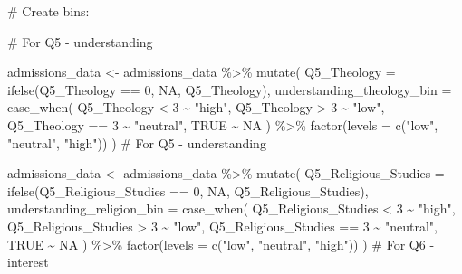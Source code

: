 \documentclass[
  letterpaper,
  DIV=11,
  numbers=noendperiod]{scrartcl}
\newenvironment{Shaded}{\begin{snugshade}}{\end{snugshade}}
\newcommand{\AttributeTok}[1]{\textcolor[rgb]{0.40,0.45,0.13}{#1}}
\newcommand{\CommentTok}[1]{\textcolor[rgb]{0.37,0.37,0.37}{#1}}
\newcommand{\ConstantTok}[1]{\textcolor[rgb]{0.56,0.35,0.01}{#1}}
\newcommand{\DecValTok}[1]{\textcolor[rgb]{0.68,0.00,0.00}{#1}}
\newcommand{\FunctionTok}[1]{\textcolor[rgb]{0.28,0.35,0.67}{#1}}
\newcommand{\NormalTok}[1]{\textcolor[rgb]{0.00,0.23,0.31}{#1}}
\newcommand{\OtherTok}[1]{\textcolor[rgb]{0.00,0.23,0.31}{#1}}
\newcommand{\SpecialCharTok}[1]{\textcolor[rgb]{0.37,0.37,0.37}{#1}}
\newcommand{\StringTok}[1]{\textcolor[rgb]{0.13,0.47,0.30}{#1}}
\begin{document}
\begin{Shaded}
\begin{Highlighting}[]
\CommentTok{\# Create bins:}

\CommentTok{\# For Q5 {-} understanding}

\NormalTok{admissions\_data }\OtherTok{\textless{}{-}}\NormalTok{ admissions\_data }\SpecialCharTok{\%\textgreater{}\%}
  \FunctionTok{mutate}\NormalTok{(}
    \AttributeTok{Q5\_Theology =} \FunctionTok{ifelse}\NormalTok{(Q5\_Theology }\SpecialCharTok{==} \DecValTok{0}\NormalTok{, }\ConstantTok{NA}\NormalTok{, Q5\_Theology),}
    \AttributeTok{understanding\_theology\_bin =} \FunctionTok{case\_when}\NormalTok{(}
\NormalTok{      Q5\_Theology }\SpecialCharTok{\textless{}} \DecValTok{3} \SpecialCharTok{\textasciitilde{}} \StringTok{"high"}\NormalTok{,}
\NormalTok{      Q5\_Theology }\SpecialCharTok{\textgreater{}} \DecValTok{3} \SpecialCharTok{\textasciitilde{}} \StringTok{"low"}\NormalTok{,}
\NormalTok{      Q5\_Theology }\SpecialCharTok{==} \DecValTok{3} \SpecialCharTok{\textasciitilde{}} \StringTok{"neutral"}\NormalTok{,}
      \ConstantTok{TRUE} \SpecialCharTok{\textasciitilde{}} \ConstantTok{NA}
\NormalTok{    ) }\SpecialCharTok{\%\textgreater{}\%} \FunctionTok{factor}\NormalTok{(}\AttributeTok{levels =} \FunctionTok{c}\NormalTok{(}\StringTok{"low"}\NormalTok{, }\StringTok{"neutral"}\NormalTok{, }\StringTok{"high"}\NormalTok{))}
\NormalTok{  )}
\CommentTok{\# For Q5 {-} understanding}

\NormalTok{admissions\_data }\OtherTok{\textless{}{-}}\NormalTok{ admissions\_data }\SpecialCharTok{\%\textgreater{}\%}
  \FunctionTok{mutate}\NormalTok{(}
    \AttributeTok{Q5\_Religious\_Studies =} \FunctionTok{ifelse}\NormalTok{(Q5\_Religious\_Studies }\SpecialCharTok{==} \DecValTok{0}\NormalTok{, }\ConstantTok{NA}\NormalTok{, Q5\_Religious\_Studies),}
    \AttributeTok{understanding\_religion\_bin =} \FunctionTok{case\_when}\NormalTok{(}
\NormalTok{      Q5\_Religious\_Studies }\SpecialCharTok{\textless{}} \DecValTok{3} \SpecialCharTok{\textasciitilde{}} \StringTok{"high"}\NormalTok{,}
\NormalTok{      Q5\_Religious\_Studies }\SpecialCharTok{\textgreater{}} \DecValTok{3} \SpecialCharTok{\textasciitilde{}} \StringTok{"low"}\NormalTok{,}
\NormalTok{      Q5\_Religious\_Studies }\SpecialCharTok{==} \DecValTok{3} \SpecialCharTok{\textasciitilde{}} \StringTok{"neutral"}\NormalTok{,}
      \ConstantTok{TRUE} \SpecialCharTok{\textasciitilde{}} \ConstantTok{NA}
\NormalTok{    ) }\SpecialCharTok{\%\textgreater{}\%} \FunctionTok{factor}\NormalTok{(}\AttributeTok{levels =} \FunctionTok{c}\NormalTok{(}\StringTok{"low"}\NormalTok{, }\StringTok{"neutral"}\NormalTok{, }\StringTok{"high"}\NormalTok{))}
\NormalTok{  )}
\CommentTok{\# For Q6 {-} interest}


\end{Highlighting}
\end{Shaded}
\end{document}
